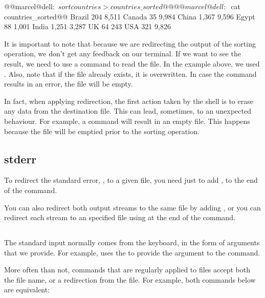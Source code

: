 \begin{command_line}[Bash]
@@marcel@dell:~$ sort countries > countries\_sorted@@
@@marcel@dell:~$ cat countries\_sorted@@
Brazil    204     8,511
Canada    35      9,984
China     1,367	  9,596
Egypt     88      1,001
India     1,251	  3,287
UK        64      243
USA       321     9,826
\end{command_line}

It is important to note that because we are redirecting the output of the sorting operation, we don't get any feedback on our terminal. If we want to see the result, we need to use a command to read the  file. In the example above, we used . Also, note that if the file   already exists, it is overwritten. In case the command results in an error, the file  will be empty.

In fact, when applying redirection, the first action taken by the shell is to erase any data from the destination file. This can lead, sometimes, to an unexpected behaviour. For example, a command  will result in an empty file. This happens because the file   will be emptied prior to the sorting operation.

\subsection*{stderr}

To redirect the standard error, , to a given file, you need just to add , to the end of the command.

You can also redirect both output streams to the same file by adding , or you can redirect each stream to an specified file using  at the end of the command.

\subsection*{}

The standard input normally comes from the keyboard, in the form of arguments that we provide. For example,  uses the  to provide the argument  to the  command.

More often than not, commands that are regularly applied to files accept both the file name, or a redirection from the file. For example, both commands below are equivalent:

